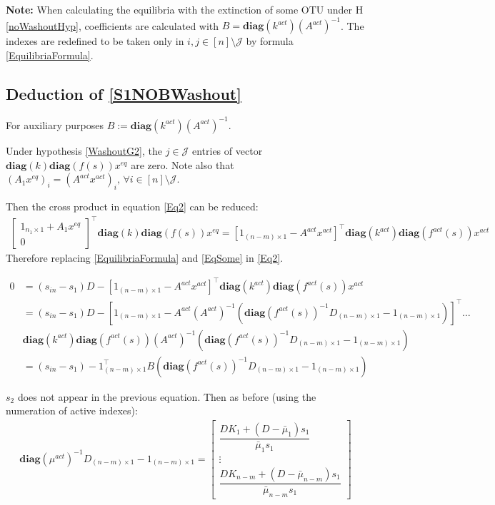 \documentclass[3p,times]{elsarticle}
\newcommand{\diag}{\textbf{diag}}
\begin{document}
\textbf{Note:} When calculating the equilibria with the extinction of some OTU under H \ref{noWashoutHyp}, coefficients are calculated with $B = \diag(k^{act})(A^{act})^{-1}$. The indexes are redefined to be taken only in $i,j \in [n] \setminus \mathcal{J}$ by formula \eqref{EquilibriaFormula}.

\subsection{Deduction of \eqref{S1NOBWashout}}
For auxiliary purposes $B:= \diag(k^{act})(A^{act})^{-1}$. 

Under hypothesis \ref{WashoutG2}, the $j \in \mathcal{J}$ entries of vector $\diag(k) \diag(f(s))x^{eq} $ are zero. 
Note also that $(A_1x^{eq})_i = (A^{act}x^{act})_i, \, \forall i \in [n] \setminus \mathcal{J}$.

Then the cross product in equation \eqref{Eq2} can be reduced:
\begin{align} 
\begin{bmatrix}
1_{n_1\times 1}+A_1x^{eq} \\0
\end{bmatrix}^\top \diag(k) \diag(f(s))x^{eq} = [1_{(n-m)\times 1} - A^{act}x^{act}]^\top \diag(k^{act}) \diag(f^{act}(s))x^{act} 
\end{align} 
Therefore replacing \eqref{EquilibriaFormula} and \eqref{EqSome} in \eqref{Eq2}.

\begin{align}
0 &= (s_{in}-s_1)D- [1_{(n-m)\times 1} - A^{act}x^{act}]^\top \diag(k^{act}) \diag(f^{act}(s))x^{act}\\
&= (s_{in}-s_1)D- [1_{(n-m)\times 1} - A^{act}(A^{act})^{-1}(\diag(f^{act}(s))^{-1}D_{(n-m)\times 1} - 1_{(n-m)\times 1})]^\top \dots \\ & \diag(k^{act}) \diag(f^{act}(s))(A^{act})^{-1}(\diag(f^{act}(s))^{-1}D_{(n-m)\times 1} - 1_{(n-m)\times 1})\\
&  =  (s_{in}-s_1)-1_{(n-m)\times 1}^\top
B(\diag(f^{act}(s))^{-1}D_{(n-m)\times 1} - 1_{(n-m)\times 1})
\end{align} 


$s_2$ does not appear in the previous equation. Then as before (using the numeration of active indexes):
\begin{align}
\diag(\mu^{act})^{-1}D_{(n-m)\times 1} - 1_{(n-m)\times 1} = \begin{bmatrix}
\dfrac{DK_1+(D-\bar{\mu}_1)s_1}{\bar{\mu}_{1}s_1} \\ \vdots \\ \dfrac{DK_{n-m}+(D-\bar{\mu}_{n-m})s_1}{\bar{\mu}_{n-m}s_1}
\end{bmatrix}
\end{align}
\end{document}
